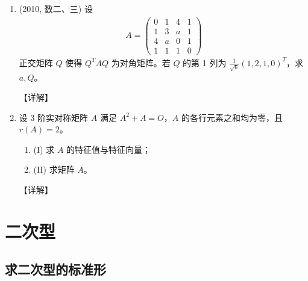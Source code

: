 \documentclass[12pt, a4paper, oneside, UTF8]{ctexbook}
\begin{document}
\begin{enumerate}[label=\arabic*.,start=11]
    \item (2010, 数二、三) 设
    \begin{align*}
    A = \begin{pmatrix}
    0 & 1 & 4 & 1 \\
    1 & 3 & a & 1 \\
    4 & a & 0 & 1 \\
    1 & 1 & 1 & 0
    \end{pmatrix}
    \end{align*}
    正交矩阵 $Q$ 使得 $Q^T A Q$ 为对角矩阵。若 $Q$ 的第 1 列为 $\frac{1}{\sqrt{6}}(1,2,1,0)^T$，求 $a, Q$。
    
    \begin{solution}
    【详解】
    \end{solution}
    
    \item 设 3 阶实对称矩阵 $A$ 满足 $A^2 + A = O$，$A$ 的各行元素之和均为零，且 $r(A) = 2$。
    \begin{enumerate}
        \item (I) 求 $A$ 的特征值与特征向量；
        \item (II) 求矩阵 $A$。
    \end{enumerate}
    
    \begin{solution}
    【详解】
    \end{solution}
\end{enumerate}

\section{二次型}

\subsection{求二次型的标准形}
\end{document}
